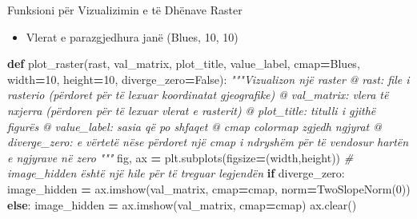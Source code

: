 \documentclass[
  ignorenonframetext,
]{beamer}
\newenvironment{Shaded}{\begin{snugshade}}{\end{snugshade}}
\newcommand{\CommentTok}[1]{\textcolor[rgb]{0.56,0.35,0.01}{\textit{#1}}}
\newcommand{\ControlFlowTok}[1]{\textcolor[rgb]{0.13,0.29,0.53}{\textbf{#1}}}
\newcommand{\DecValTok}[1]{\textcolor[rgb]{0.00,0.00,0.81}{#1}}
\newcommand{\KeywordTok}[1]{\textcolor[rgb]{0.13,0.29,0.53}{\textbf{#1}}}
\newcommand{\NormalTok}[1]{#1}
\newcommand{\OperatorTok}[1]{\textcolor[rgb]{0.81,0.36,0.00}{\textbf{#1}}}
\newcommand{\StringTok}[1]{\textcolor[rgb]{0.31,0.60,0.02}{#1}}
\newcommand{\VariableTok}[1]{\textcolor[rgb]{0.00,0.00,0.00}{#1}}
\providecommand{\tightlist}{%
  \setlength{\itemsep}{0pt}\setlength{\parskip}{0pt}}
\begin{document}
\begin{frame}[fragile]{Funksioni për Vizualizimin e të Dhënave Raster}
\protect\hypertarget{funksioni-puxebr-vizualizimin-e-tuxeb-dhuxebnave-raster-1}{}
\begin{itemize}
\tightlist
\item
  Vlerat e parazgjedhura janë (Blues, 10, 10)
\end{itemize}


\begin{Shaded}
\begin{Highlighting}[]
\KeywordTok{def}\NormalTok{ plot\_raster(rast, val\_matrix, plot\_title, value\_label, cmap}\OperatorTok{=}\StringTok{\textquotesingle{}Blues\textquotesingle{}}\NormalTok{, width}\OperatorTok{=}\DecValTok{10}\NormalTok{, }
\NormalTok{height}\OperatorTok{=}\DecValTok{10}\NormalTok{, diverge\_zero}\OperatorTok{=}\VariableTok{False}\NormalTok{):}
    \CommentTok{"""Vizualizon një raster}
\CommentTok{        @ rast: file i rasterio (përdoret për të lexuar koordinatat gjeografike)}
\CommentTok{        @ val\_matrix: vlera të nxjerra (përdoren për të lexuar vlerat e rasterit)}
\CommentTok{        @ plot\_title: titulli i gjithë figurës}
\CommentTok{        @ value\_label: sasia që po shfaqet}
\CommentTok{        @ cmap colormap zgjedh ngjyrat}
\CommentTok{        @ diverge\_zero: e vërtetë nëse përdoret një cmap i ndryshëm për të vendosur hartën e ngjyrave në zero}
\CommentTok{    """}
\NormalTok{    fig, ax }\OperatorTok{=}\NormalTok{ plt.subplots(figsize}\OperatorTok{=}\NormalTok{(width,height))}
    \CommentTok{\# image\_hidden është një hile për të treguar legjendën}
    \ControlFlowTok{if}\NormalTok{ diverge\_zero:}
\NormalTok{        image\_hidden }\OperatorTok{=}\NormalTok{ ax.imshow(val\_matrix, cmap}\OperatorTok{=}\NormalTok{cmap, norm}\OperatorTok{=}\NormalTok{TwoSlopeNorm(}\DecValTok{0}\NormalTok{))}
    \ControlFlowTok{else}\NormalTok{:}
\NormalTok{        image\_hidden }\OperatorTok{=}\NormalTok{ ax.imshow(val\_matrix, cmap}\OperatorTok{=}\NormalTok{cmap)}
\NormalTok{    ax.clear()}
\end{Highlighting}
\end{Shaded}
\end{frame}
\end{document}
